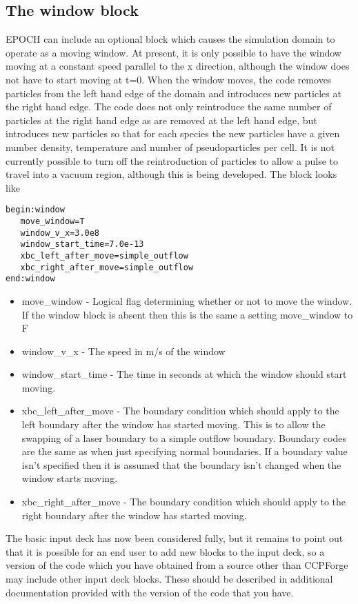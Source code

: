 \documentclass[12pt]{article}
\newcommand{\simpleboxverbatim}{\begin{Verbatim}[obeytabs=true,frame=single,
  framerule=0.5mm,rulecolor=\color{warwickmid}]}
\newcommand{\nEPOCH}{{\color{warwickdark}\fontfamily{phv}\selectfont EPOCH}}
\newcommand{\EPOCH}{{\nEPOCH} }
\begin{document}
\subsection{The window block}
\EPOCH can include an optional block which causes the simulation domain to
operate as a moving window. At present, it is only possible to have the window
moving at a constant speed parallel to the x direction, although the window
does not have to start moving at t=0. When the window moves, the code removes
particles from the left hand edge of the domain and introduces new particles
at the right hand edge. The code does not only reintroduce the same number of
particles at the right hand edge as are removed at the left hand edge, but
introduces new particles so that for each species the new particles have a
given number density, temperature and number of pseudoparticles per cell. It
is not currently possible to turn off the reintroduction of particles to allow
a pulse to travel into a vacuum region, although this is being developed. The
block looks like\\
\simpleboxverbatim
begin:window
   move_window=T
   window_v_x=3.0e8
   window_start_time=7.0e-13
   xbc_left_after_move=simple_outflow
   xbc_right_after_move=simple_outflow
end:window
\end{Verbatim}

\begin{itemize}
\item move\_window - Logical flag determining whether or not to move the
  window. If the window block is absent then this is the same a setting
  move\_window to F
\item window\_v\_x - The speed in m/s of the window
\item window\_start\_time - The time in seconds at which the window should
  start moving.
\item xbc\_left\_after\_move - The boundary condition which should apply to
  the left boundary after the window has started moving. This is to allow the
  swapping of a laser boundary to a simple outflow boundary. Boundary codes
  are the same as when just specifying normal boundaries. If a boundary value
  isn't specified then it is assumed that the boundary isn't changed when the
  window starts moving.
\item xbc\_right\_after\_move - The boundary condition which should apply to
  the right boundary after the window has started moving.
\end{itemize}

The basic input deck has now been considered fully, but it remains to point
out that it is possible for an end user to add new blocks to the input deck,
so a version of the code which you have obtained from a source other than
CCPForge may include other input deck blocks. These should be described in
additional documentation provided with the version of the code that you have.
\end{document}
